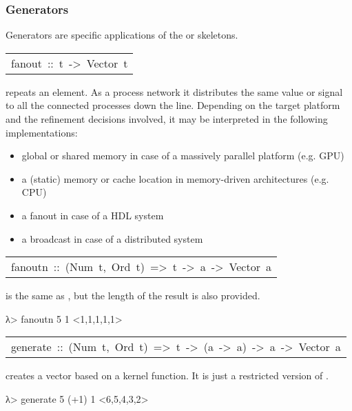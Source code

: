 \subsubsection{Generators}
Generators are specific applications of the  or
  skeletons.\par

\begin{haddockdesc}
\item[\begin{tabular}{@{}l}
fanout\ ::\ t\ ->\ Vector\ t
\end{tabular}]\haddockbegindoc
{} repeats an element. As a process network it distributes
 the same value or signal to all the connected processes down the
 line. Depending on the target platform and the refinement decisions
 involved, it may be interpreted in the following implementations:\par
\begin{itemize}
\item
global or shared memory in case of a massively parallel platform
  (e.g. GPU)\par

\item
a (static) memory or cache location in memory-driven
  architectures (e.g. CPU)\par

\item
a fanout in case of a HDL system\par

\item
a broadcast in case of a distributed system\par

\end{itemize}


\item[\begin{tabular}{@{}l}
fanoutn\ ::\ (Num\ t,\ Ord\ t)\ =>\ t\ ->\ a\ ->\ Vector\ a
\end{tabular}]\haddockbegindoc
{} is the same as , but the length of the result
 is also provided.\par
\begin{interactive}
λ> fanoutn 5 1
<1,1,1,1,1>

\end{interactive}

\item[\begin{tabular}{@{}l}
generate\ ::\ (Num\ t,\ Ord\ t)\ =>\ t\ ->\ (a\ ->\ a)\ ->\ a\ ->\ Vector\ a
\end{tabular}]\haddockbegindoc
{} creates a vector based on a kernel function. It is
 just a restricted version of .\par
\begin{interactive}
λ> generate 5 (+1) 1
<6,5,4,3,2>


\end{interactive}
\end{haddockdesc}
